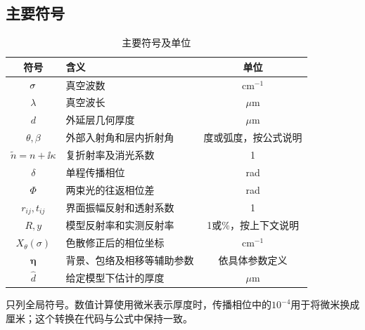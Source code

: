 \subsection{主要符号}
\begin{table}[htbp]\centering
\caption{主要符号及单位}\label{tab:symbols}
\begin{tabularx}{\textwidth}{cLc}
\toprule 符号 & 含义 & 单位\\\midrule
$\sigma$ & 真空波数 & $\mathrm{cm}^{-1}$\\
$\lambda$ & 真空波长 & $\mu\mathrm{m}$\\
$d$ & 外延层几何厚度 & $\mu\mathrm{m}$\\
$\theta,\beta$ & 外部入射角和层内折射角 & 度或弧度，按公式说明\\
$\widetilde n=n+\ii\kappa$ & 复折射率及消光系数 & 1\\
$\delta$ & 单程传播相位 & rad\\
$\Phi$ & 两束光的往返相位差 & rad\\
$r_{ij},t_{ij}$ & 界面振幅反射和透射系数 & 1\\
$R,y$ & 模型反射率和实测反射率 & 1或\%，按上下文说明\\
$X_\theta(\sigma)$ & 色散修正后的相位坐标 & $\mathrm{cm}^{-1}$\\
$\boldsymbol\eta$ & 背景、包络及相移等辅助参数 & 依具体参数定义\\
$\widehat d$ & 给定模型下估计的厚度 & $\mu\mathrm{m}$\\
\bottomrule
\end{tabularx}\end{table}
只列全局符号。数值计算使用微米表示厚度时，传播相位中的$10^{-4}$用于将微米换成厘米；这个转换在代码与公式中保持一致。

